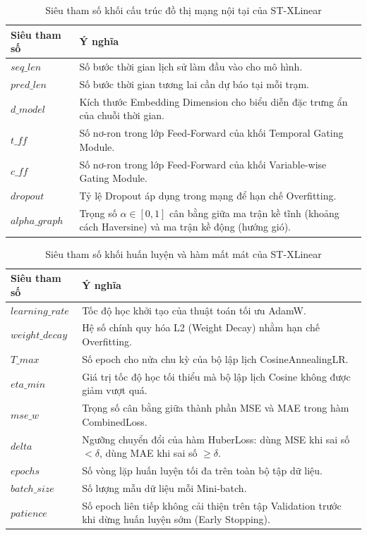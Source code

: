 \begin{table}[H]
\centering
\caption{Siêu tham số khối cấu trúc đồ thị mạng nội tại của ST-XLinear}
\label{tab:stxlinear_structure}
\renewcommand{\arraystretch}{1.3}
\begin{tabular}{p{3.8cm} p{10.5cm}}
\toprule
\textbf{Siêu tham số} & \textbf{Ý nghĩa} \\
\midrule
$seq\_len$ & Số bước thời gian lịch sử làm đầu vào cho mô hình. \\
$pred\_len$ & Số bước thời gian tương lai cần dự báo tại mỗi trạm. \\
$d\_model$ & Kích thước Embedding Dimension cho biểu diễn đặc trưng ẩn của chuỗi thời gian. \\
$t\_ff$ & Số nơ-ron trong lớp Feed-Forward của khối Temporal Gating Module. \\
$c\_ff$ & Số nơ-ron trong lớp Feed-Forward của khối Variable-wise Gating Module. \\
$dropout$ & Tỷ lệ Dropout áp dụng trong mạng để hạn chế Overfitting. \\
$alpha\_graph$ & Trọng số $\alpha \in [0,1]$ cân bằng giữa ma trận kề tĩnh (khoảng cách Haversine) và ma trận kề động (hướng gió). \\
\bottomrule
\end{tabular}
\end{table}

\begin{table}[H]
\centering
\caption{Siêu tham số khối huấn luyện và hàm mất mát của ST-XLinear}
\label{tab:stxlinear_optim}
\renewcommand{\arraystretch}{1.3}
\begin{tabular}{p{3.8cm} p{10.5cm}}
\toprule
\textbf{Siêu tham số} & \textbf{Ý nghĩa} \\
\midrule
$learning\_rate$ & Tốc độ học khởi tạo của thuật toán tối ưu AdamW. \\
$weight\_decay$ & Hệ số chính quy hóa L2 (Weight Decay) nhằm hạn chế Overfitting. \\
$T\_max$ & Số epoch cho nửa chu kỳ của bộ lập lịch CosineAnnealingLR. \\
$eta\_min$ & Giá trị tốc độ học tối thiểu mà bộ lập lịch Cosine không được giảm vượt quá. \\
$mse\_w$ & Trọng số cân bằng giữa thành phần MSE và MAE trong hàm CombinedLoss. \\
$delta$ & Ngưỡng chuyển đổi của hàm HuberLoss: dùng MSE khi sai số $< \delta$, dùng MAE khi sai số $\geq \delta$. \\
$epochs$ & Số vòng lặp huấn luyện tối đa trên toàn bộ tập dữ liệu. \\
$batch\_size$ & Số lượng mẫu dữ liệu mỗi Mini-batch. \\
$patience$ & Số epoch liên tiếp không cải thiện trên tập Validation trước khi dừng huấn luyện sớm (Early Stopping). \\
\bottomrule
\end{tabular}
\end{table}

